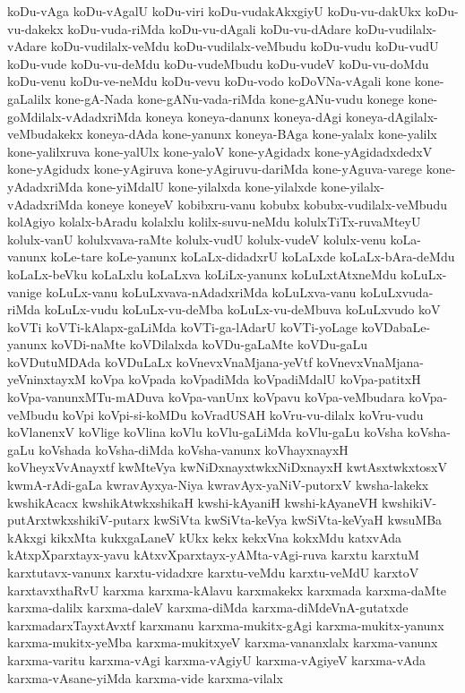 {koDu-vAga
koDu-vAgalU
koDu-viri
koDu-vudakAkxgiyU
koDu-vu-dakUkx
koDu-vu-dakekx
koDu-vuda-riMda
koDu-vu-dAgali
koDu-vu-dAdare
koDu-vudilalx-vAdare
koDu-vudilalx-veMdu
koDu-vudilalx-veMbudu
koDu-vudu
koDu-vudU
koDu-vude
koDu-vu-deMdu
koDu-vudeMbudu
koDu-vudeV
koDu-vu-doMdu
koDu-venu
koDu-ve-neMdu
koDu-vevu
koDu-vodo
koDoVNa-vAgali
kone
kone-gaLalilx
kone-gA-Nada
kone-gANu-vada-riMda
kone-gANu-vudu
konege
kone-goMdilalx-vAdadxriMda
koneya
koneya-danunx
koneya-dAgi
koneya-dAgilalx-veMbudakekx
koneya-dAda
kone-yanunx
koneya-BAga
kone-yalalx
kone-yalilx
kone-yalilxruva
kone-yalUlx
kone-yaloV
kone-yAgidadx
kone-yAgidadxdedxV
kone-yAgidudx
kone-yAgiruva
kone-yAgiruvu-dariMda
kone-yAguva-varege
kone-yAdadxriMda
kone-yiMdalU
kone-yilalxda
kone-yilalxde
kone-yilalx-vAdadxriMda
koneye
koneyeV
kobibxru-vanu
kobubx
kobubx-vudilalx-veMbudu
kolAgiyo
kolalx-bAradu
kolalxlu
kolilx-suvu-neMdu
kolulxTiTx-ruvaMteyU
kolulx-vanU
kolulxvava-raMte
kolulx-vudU
kolulx-vudeV
kolulx-venu
koLa-vanunx
koLe-tare
koLe-yanunx
koLaLx-didadxrU
koLaLxde
koLaLx-bAra-deMdu
koLaLx-beVku
koLaLxlu
koLaLxva
koLiLx-yanunx
koLuLxtAtxneMdu
koLuLx-vanige
koLuLx-vanu
koLuLxvava-nAdadxriMda
koLuLxva-vanu
koLuLxvuda-riMda
koLuLx-vudu
koLuLx-vu-deMba
koLuLx-vu-deMbuva
koLuLxvudo
koV
koVTi
koVTi-kAlapx-gaLiMda
koVTi-ga-lAdarU
koVTi-yoLage
koVDabaLe-yanunx
koVDi-naMte
koVDilalxda
koVDu-gaLaMte
koVDu-gaLu
koVDutuMDAda
koVDuLaLx
koVnevxVnaMjana-yeVtf
koVnevxVnaMjana-yeVninxtayxM
koVpa
koVpada
koVpadiMda
koVpadiMdalU
koVpa-patitxH
koVpa-vanunxMTu-mADuva
koVpa-vanUnx
koVpavu
koVpa-veMbudara
koVpa-veMbudu
koVpi
koVpi-si-koMDu
koVradUSAH
koVru-vu-dilalx
koVru-vudu
koVlanenxV
koVlige
koVlina
koVlu
koVlu-gaLiMda
koVlu-gaLu
koVsha
koVsha-gaLu
koVshada
koVsha-diMda
koVsha-vanunx
koVhayxnayxH
koVheyxVvAnayxtf
kwMteVya
kwNiDxnayxtwkxNiDxnayxH
kwtAsxtwkxtosxV
kwmA-rAdi-gaLa
kwravAyxya-Niya
kwravAyx-yaNiV-putorxV
kwsha-lakekx
kwshikAcacx
kwshikAtwkxshikaH
kwshi-kAyaniH
kwshi-kAyaneVH
kwshikiV-putArxtwkxshikiV-putarx
kwSiVta
kwSiVta-keVya
kwSiVta-keVyaH
kwsuMBa
kAkxgi
kikxMta
kukxgaLaneV
kUkx
kekx
kekxVna
kokxMdu
katxvAda
kAtxpXparxtayx-yavu
kAtxvXparxtayx-yAMta-vAgi-ruva
karxtu
karxtuM
karxtutavx-vanunx
karxtu-vidadxre
karxtu-veMdu
karxtu-veMdU
karxtoV
karxtavxthaRvU
karxma
karxma-kAlavu
karxmakekx
karxmada
karxma-daMte
karxma-dalilx
karxma-daleV
karxma-diMda
karxma-diMdeVnA-gutatxde
karxmadarxTayxtAvxtf
karxmanu
karxma-mukitx-gAgi
karxma-mukitx-yanunx
karxma-mukitx-yeMba
karxma-mukitxyeV
karxma-vananxlalx
karxma-vanunx
karxma-varitu
karxma-vAgi
karxma-vAgiyU
karxma-vAgiyeV
karxma-vAda
karxma-vAsane-yiMda
karxma-vide
karxma-vilalx
}
